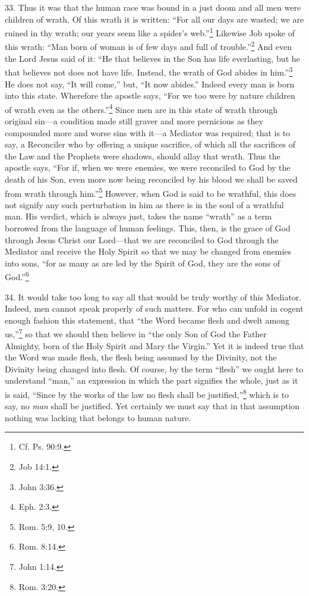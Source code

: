 33. Thus it was that the human race was bound in a just doom and all men were children of wrath. Of this wrath it is written: ``For all our days are wasted; we are ruined in thy wrath; our years seem like a spider's web.''\footnote{Cf. Ps. 90:9.} Likewise Job spoke of this wrath: ``Man born of woman is of few days and full of trouble.''\footnote{Job 14:1.} And even the Lord Jesus said of it: ``He that believes in the Son has life everlasting, but he that believes not does not have life. Instead, the wrath of God abides in him.''\footnote{John 3:36.} He does not say, ``It will come,'' but, ``It now abides.'' Indeed every man is born into this state. Wherefore the apostle says, ``For we too were by nature children of wrath even as the others.''\footnote{Eph. 2:3.} Since men are in this state of wrath through original sin—a condition made still graver and more pernicious as they compounded more and worse sins with it—a Mediator was required; that is to say, a Reconciler who by offering a unique sacrifice, of which all the sacrifices of the Law and the Prophets were shadows, should allay that wrath. Thus the apostle says, ``For if, when we were enemies, we were reconciled to God by the death of his Son, even more now being reconciled by his blood we shall be saved from wrath through him.''\footnote{Rom. 5:9, 10.} However, when God is said to be wrathful, this does not signify any such perturbation in him as there is in the soul of a wrathful man. His verdict, which is always just, takes the name ``wrath'' as a term borrowed from the language of human feelings. This, then, is the grace of God through Jesus Christ our Lord—that we are reconciled to God through the Mediator and receive the Holy Spirit so that we may be changed from enemies into sons, ``for as many as are led by the Spirit of God, they are the sons of God.''\footnote{Rom. 8:14.}

34. It would take too long to say all that would be truly worthy of this Mediator. Indeed, men cannot speak properly of such matters. For who can unfold in cogent enough fashion this statement, that ``the Word became flesh and dwelt among us,''\footnote{John 1:14.} so that we should then believe in ``the only Son of God the Father Almighty, born of the Holy Spirit and Mary the Virgin.'' Yet it is indeed true that the Word was made flesh, the flesh being assumed by the Divinity, not the Divinity being changed into flesh. Of course, by the term ``flesh'' we ought here to understand ``man,'' an expression in which the part signifies the whole, just as it is said, ``Since by the works of the law no flesh shall be justified,''\footnote{Rom. 3:20.} which is to say, no \emph{man} shall be justified. Yet certainly we must say that in that assumption nothing was lacking that belongs to human nature.

